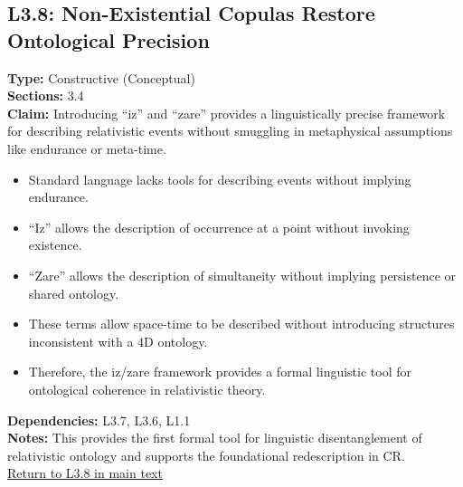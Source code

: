 \documentclass[12pt]{book}
\newcommand{\returnlink}[1]{\hyperref[logic:#1]{Return to #1 in main text}\xspace}
\begin{document}
\subsection*{L3.8: Non-Existential Copulas Restore Ontological Precision}\label{appendix:L3.8}
\textbf{Type:} Constructive (Conceptual) \\
\textbf{Sections:} 3.4 \\
\textbf{Claim:} Introducing ``iz'' and ``zare'' provides a linguistically precise framework for describing relativistic events without smuggling in metaphysical assumptions like endurance or meta-time.
\begin{itemize}
  \item Standard language lacks tools for describing events without implying endurance.
  \item ``Iz'' allows the description of occurrence at a point without invoking existence.
  \item ``Zare'' allows the description of simultaneity without implying persistence or shared ontology.
  \item These terms allow space-time to be described without introducing structures inconsistent with a 4D ontology.
  \item Therefore, the iz/zare framework provides a formal linguistic tool for ontological coherence in relativistic theory.
\end{itemize}
\textbf{Dependencies:} L3.7, L3.6, L1.1 \\
\textbf{Notes:} This provides the first formal tool for linguistic disentanglement of relativistic ontology and supports the foundational redescription in CR.\\
\returnlink{L3.8}
\end{document}
